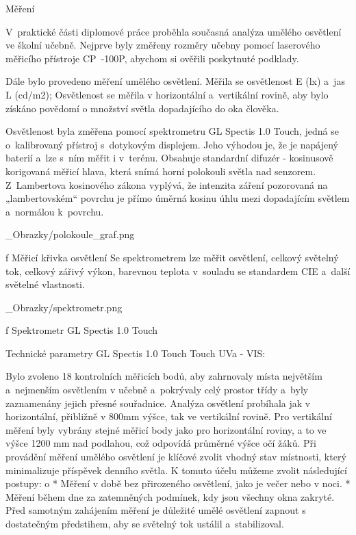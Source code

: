 \chap Měření

V~praktické části diplomové práce proběhla současná analýza umělého osvětlení ve školní učebně.
Nejprve byly změřeny rozměry učebny pomocí laserového měřicího přístroje {\sbf CP~-100P},
abychom si ověřili poskytnuté podklady.

Dále bylo provedeno měření umělého osvětlení. Měřila se osvětlenost E (lx) a~jas L (cd/m2);
Osvětlenost se měřila v horizontální a~vertikální rovině, aby bylo získáno povědomí o množství světla dopadajícího do oka člověka.

Osvětlenost byla změřena pomocí spektrometru {\sbf GL Spectis 1.0 Touch}, jedná se o~kalibrovaný přístroj
s~dotykovým displejem. Jeho výhodou je, že je napájený baterií a~lze s~ním měřit i v~terénu. Obsahuje standardní
difuzér - kosinusově korigovaná měřicí hlava, která snímá horní polokouli světla nad senzorem. Z~Lambertova
kosinového zákona vyplývá, že intenzita záření pozorovaná na „lambertovském“ povrchu je přímo úměrná kosinu
úhlu mezi dopadajícím světlem a~normálou k~povrchu.

\medskip {}
\picw=8cm _Obrazky/polokoule_graf.png
\caption/f Měřicí křivka osvětlení
\medskip
Se spektrometrem lze měřit osvětlení, celkový světelný tok, celkový zářivý výkon, barevnou teplota v~souladu
se standardem CIE a~další světelné vlastnosti.

\medskip {}
\picw=5cm _Obrazky/spektrometr.png
\caption/f Spektrometr GL Spectis 1.0 Touch
\medskip

\medskip
{\sbf Technické parametry GL Spectis 1.0 Touch Touch UVa - VIS:}
\medskip
{}

Bylo zvoleno 18 kontrolních měřicích bodů, aby zahrnovaly místa  největším a~nejmenším osvětlením v učebně a~pokrývaly celý prostor třídy
a~byly zaznamenány jejich přesné souřadnice. Analýza osvětlení probíhala jak v horizontální,
přibližně v 800mm výšce, tak ve vertikální rovině. Pro vertikální měření byly vybrány stejné měřicí body jako pro horizontální roviny,
a to ve výšce 1200 mm nad podlahou, což odpovídá průměrné výšce očí žáků.
\medskip
Při provádění měření umělého osvětlení je klíčové zvolit vhodný stav místnosti,
který minimalizuje příspěvek denního světla. K tomuto účelu můžeme zvolit následující postupy:
\medskip
\begitems \style o
    * Měření v době bez přirozeného osvětlení, jako je večer nebo v noci.
    * Měření během dne za zatemněných podmínek, kdy jsou všechny okna zakryté.
\enditems
\medskip
Před samotným zahájením měření je důležité umělé osvětlení zapnout s dostatečným předstihem, aby se světelný tok ustálil a~stabilizoval.

